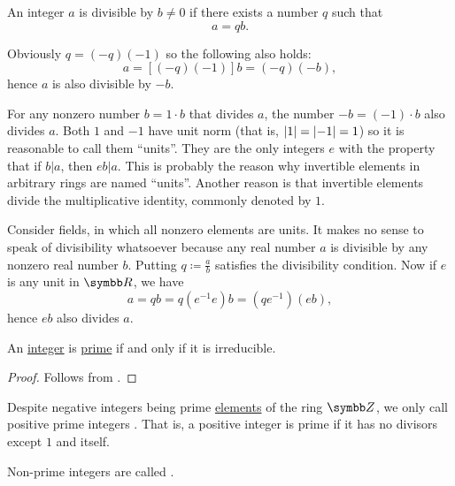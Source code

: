 \begin{remark}\label{remark:units_in_rings_etymology}
  An integer \( a \) is divisible by \( b \neq 0 \) if there exists a number \( q \) such that
  \begin{equation*}
    a = qb.
  \end{equation*}

  Obviously \( q = (-q)(-1) \) so the following also holds:
  \begin{equation*}
    a = [(-q)(-1)]b = (-q)(-b),
  \end{equation*}
  hence \( a \) is also divisible by \( -b \).

  For any nonzero number \( b = 1 \cdot b \) that divides \( a \), the number \( -b = (-1) \cdot b \) also divides \( a \). Both \( 1 \) and \( -1 \) have unit norm (that is, \( \left\vert 1 \right\vert = \left\vert -1 \right\vert = 1 \)) so it is reasonable to call them \enquote{units}. They are the only integers \( e \) with the property that if \( b | a \), then \( eb | a \). This is probably the reason why invertible elements in arbitrary rings are named \enquote{units}. Another reason is that invertible elements divide the multiplicative identity, commonly denoted by \( 1 \).

  Consider fields, in which all nonzero elements are units. It makes no sense to speak of divisibility whatsoever because any real number \( a \) is divisible by any nonzero real number \( b \). Putting \( q \coloneqq \frac a b \) satisfies the divisibility condition. Now if \( e \) is any unit in \( \BR \), we have
  \begin{equation*}
    a = qb = q(e^{-1} e) b = (qe^{-1}) (eb),
  \end{equation*}
  hence \( eb \) also divides \( a \).
\end{remark}

\begin{lemma}\label{thm:euclids_lemma}
  An \hyperref[def:integers]{integer} is \hyperref[def:prime_ring_ideal]{prime} if and only if it is irreducible.
\end{lemma}
\begin{proof}
  Follows from .
\end{proof}

\begin{definition}\label{def:prime_number}
  Despite negative integers being prime \hyperref[thm:euclids_lemma]{elements} of the ring \( \BZ \), we only call positive prime integers . That is, a positive integer is prime if it has no divisors except \( 1 \) and itself.

  Non-prime integers are called .
\end{definition}

